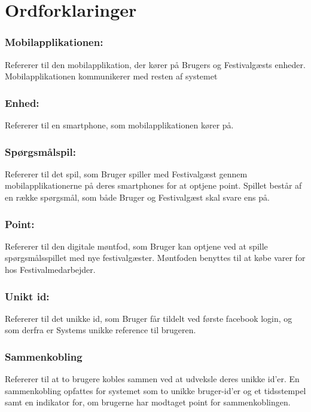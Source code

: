 \newpage

\section{Ordforklaringer}

\subsubsection{Mobilapplikationen:}
Refererer til den mobilapplikation, der kører på Brugers og Festivalgæsts enheder. Mobilapplikationen kommunikerer med resten af systemet

\subsubsection{Enhed:}
Refererer til en smartphone, som mobilapplikationen kører på.

\subsubsection{Spørgsmålspil:}
Refererer til det spil, som Bruger spiller med Festivalgæst gennem mobilapplikationerne på deres smartphones for at optjene point. Spillet består af en række spørgsmål, som både Bruger og Festivalgæst skal svare ens på.

\subsubsection{Point:}
Refererer til den digitale møntfod, som Bruger kan optjene ved at spille spørgsmålsspillet med nye festivalgæster. Møntfoden benyttes til at købe varer for hos Festivalmedarbejder.

\subsubsection{Unikt id:}
Refererer til det unikke id, som Bruger får tildelt ved første facebook login, og som derfra er Systems unikke reference til brugeren.

\subsubsection{Sammenkobling}
Refererer til at to brugere kobles sammen ved at udveksle deres unikke id'er. En sammenkobling opfattes for systemet som to unikke bruger-id'er og et tidsstempel samt en indikator for, om brugerne har modtaget point for sammenkoblingen.

